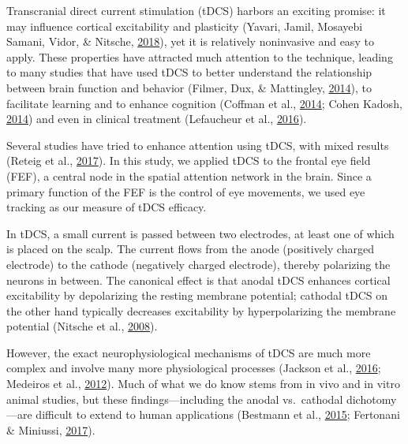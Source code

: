 \documentclass[11pt,]{memoir}
\begin{document}
Transcranial direct current stimulation (tDCS) harbors an exciting promise: it may influence cortical excitability and plasticity (Yavari, Jamil, Mosayebi Samani, Vidor, \& Nitsche, \protect\hyperlink{ref-Yavari2018}{2018}), yet it is relatively noninvasive and easy to apply. These properties have attracted much attention to the technique, leading to many studies that have used tDCS to better understand the relationship between brain function and behavior (Filmer, Dux, \& Mattingley, \protect\hyperlink{ref-Filmer2014}{2014}), to facilitate learning and to enhance cognition (Coffman et al., \protect\hyperlink{ref-Coffman2014}{2014}; Cohen Kadosh, \protect\hyperlink{ref-CohenKadosh2014}{2014}) and even in clinical treatment (Lefaucheur et al., \protect\hyperlink{ref-Lefaucheur2016}{2016}).

Several studies have tried to enhance attention using tDCS, with mixed results (Reteig et al., \protect\hyperlink{ref-Reteig2017}{2017}). In this study, we applied tDCS to the frontal eye field (FEF), a central node in the spatial attention network in the brain. Since a primary function of the FEF is the control of eye movements, we used eye tracking as our measure of tDCS efficacy.

In tDCS, a small current is passed between two electrodes, at least one of which is placed on the scalp. The current flows from the anode (positively charged electrode) to the cathode (negatively charged electrode), thereby polarizing the neurons in between. The canonical effect is that anodal tDCS enhances cortical excitability by depolarizing the resting membrane potential; cathodal tDCS on the other hand typically decreases excitability by hyperpolarizing the membrane potential (Nitsche et al., \protect\hyperlink{ref-Nitsche2008}{2008}).

However, the exact neurophysiological mechanisms of tDCS are much more complex and involve many more physiological processes (Jackson et al., \protect\hyperlink{ref-Jackson2016}{2016}; Medeiros et al., \protect\hyperlink{ref-Medeiros2012}{2012}). Much of what we do know stems from in vivo and in vitro animal studies, but these findings---including the anodal vs.~cathodal dichotomy---are difficult to extend to human applications (Bestmann et al., \protect\hyperlink{ref-Bestmann2014}{2015}; Fertonani \& Miniussi, \protect\hyperlink{ref-Fertonani2017}{2017}).
\end{document}
